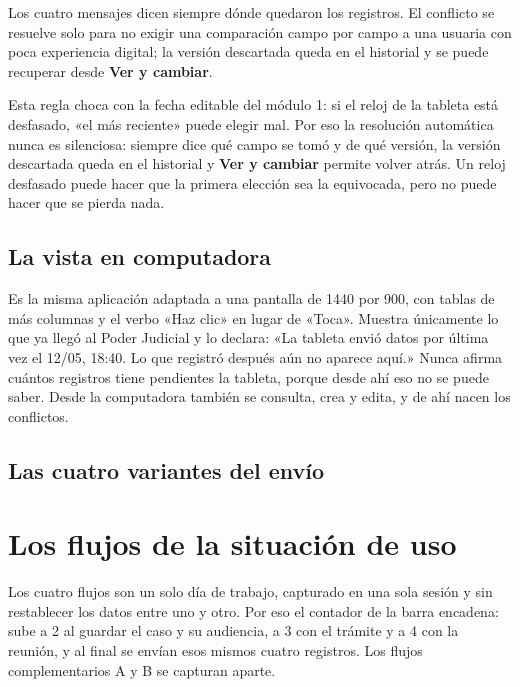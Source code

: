 \documentclass[11pt,a4paper]{article}
\begin{document}
Los cuatro mensajes dicen siempre dónde quedaron los registros. El conflicto se resuelve solo para no exigir una comparación campo por campo a una usuaria con poca experiencia digital; la versión descartada queda en el historial y se puede recuperar desde \textbf{Ver y cambiar}.

Esta regla choca con la fecha editable del módulo 1: si el reloj de la tableta está desfasado, «el más reciente» puede elegir mal. Por eso la resolución automática nunca es silenciosa: siempre dice qué campo se tomó y de qué versión, la versión descartada queda en el historial y \textbf{Ver y cambiar} permite volver atrás. Un reloj desfasado puede hacer que la primera elección sea la equivocada, pero no puede hacer que se pierda nada.

\subsection{La vista en computadora}

Es la misma aplicación adaptada a una pantalla de 1440 por 900, con tablas de más columnas y el verbo «Haz clic» en lugar de «Toca». Muestra únicamente lo que ya llegó al Poder Judicial y lo declara: «La tableta envió datos por última vez el 12/05, 18:40. Lo que registró después aún no aparece aquí.» Nunca afirma cuántos registros tiene pendientes la tableta, porque desde ahí eso no se puede saber. Desde la computadora también se consulta, crea y edita, y de ahí nacen los conflictos.



\subsection{Las cuatro variantes del envío}



\section{Los flujos de la situación de uso}

Los cuatro flujos son un solo día de trabajo, capturado en una sola sesión y sin restablecer los datos entre uno y otro. Por eso el contador de la barra encadena: sube a 2 al guardar el caso y su audiencia, a 3 con el trámite y a 4 con la reunión, y al final se envían esos mismos cuatro registros. Los flujos complementarios A y B se capturan aparte.


\end{document}
